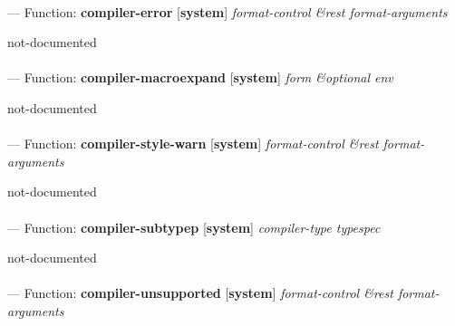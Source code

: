 \paragraph{}
\label{SYSTEM:COMPILER-ERROR}
--- Function: \textbf{compiler-error} [\textbf{system}] \textit{format-control \&rest format-arguments}

\begin{adjustwidth}{5em}{5em}
not-documented
\end{adjustwidth}

\paragraph{}
\label{SYSTEM:COMPILER-MACROEXPAND}
--- Function: \textbf{compiler-macroexpand} [\textbf{system}] \textit{form \&optional env}

\begin{adjustwidth}{5em}{5em}
not-documented
\end{adjustwidth}

\paragraph{}
\label{SYSTEM:COMPILER-STYLE-WARN}
--- Function: \textbf{compiler-style-warn} [\textbf{system}] \textit{format-control \&rest format-arguments}

\begin{adjustwidth}{5em}{5em}
not-documented
\end{adjustwidth}

\paragraph{}
\label{SYSTEM:COMPILER-SUBTYPEP}
--- Function: \textbf{compiler-subtypep} [\textbf{system}] \textit{compiler-type typespec}

\begin{adjustwidth}{5em}{5em}
not-documented
\end{adjustwidth}

\paragraph{}
\label{SYSTEM:COMPILER-UNSUPPORTED}
--- Function: \textbf{compiler-unsupported} [\textbf{system}] \textit{format-control \&rest format-arguments}

